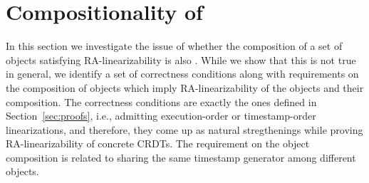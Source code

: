 
\section{Compositionality of \CRDTLin{}}
\label{sec:compositionality}




In this section we investigate the issue of whether the composition of a set of objects satisfying RA-linearizability is also \crdtlinearizable{}. While we show that this is not true in general, we identify a set of correctness conditions along with requirements on the composition of objects which imply RA-linearizability of the objects and their composition. The correctness conditions are exactly the ones defined in Section~\ref{sec:proofs}, i.e., admitting execution-order or timestamp-order linearizations, and therefore, they come up as natural stregthenings while proving RA-linearizability of concrete CRDTs. The requirement on the object composition is related to sharing the same timestamp generator among different objects.

